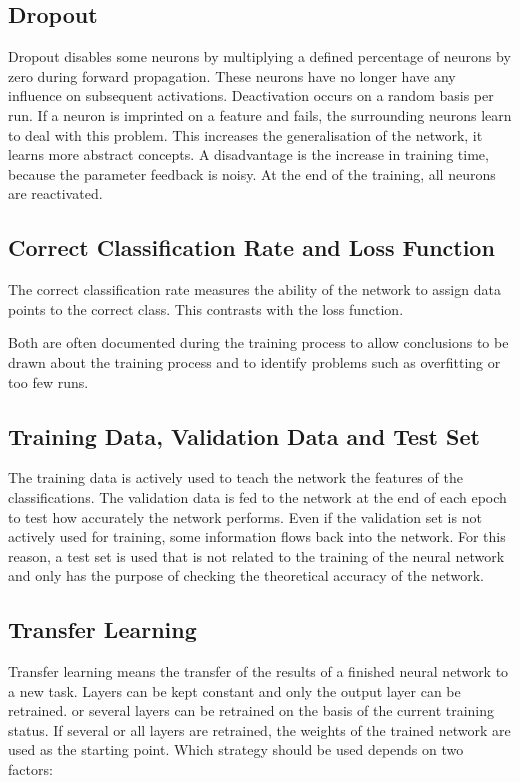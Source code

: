 \subsection{Dropout}

Dropout disables some neurons by multiplying a defined percentage of neurons by zero during forward propagation. These neurons have
no longer have any influence on subsequent activations. Deactivation occurs on a random basis per run. If a neuron is imprinted on a feature and fails, the surrounding neurons learn to deal with this problem. This increases the generalisation of the network, it learns more abstract concepts. A disadvantage is the increase in training time, because the parameter feedback is noisy. At the end of the training, all neurons are reactivated. \cite{Becker:2018c}

\subsection{Correct Classification Rate and Loss Function}

The correct classification rate measures the ability of the network to assign data points to the correct class. This contrasts with the loss function. \cite{Chollet:2018}

Both are often documented during the training process to allow conclusions to be drawn about the training process and to identify problems such as overfitting or too few runs.

\subsection{Training Data, Validation Data and Test Set}

The training data is actively used to teach the network the features of the classifications. 	The validation data is fed to the network at the end of each epoch to test how accurately the network performs. Even if the validation set is not actively used for training, some information flows back into the network.	For this reason, a test set is used that is not related to the training of the neural network and only has the purpose of checking the theoretical accuracy of the network. \cite{Becker:2018}

\subsection{Transfer Learning}

Transfer learning means the transfer of the results of a finished neural network to a new task. 	Layers can be kept constant and only the output layer can be retrained.
or several layers can be retrained on the basis of the current training status. If several or all layers are retrained, the weights of the trained network are used as the starting point. Which strategy should be used depends on two factors:

